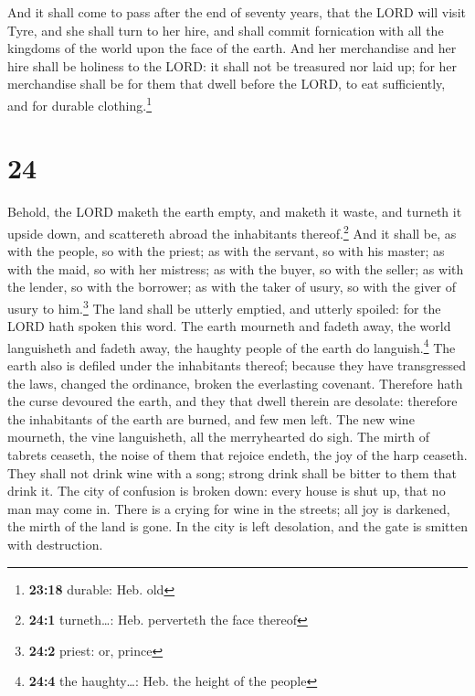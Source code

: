  And it shall come to pass after the end of seventy
years, that the LORD will visit Tyre, and she shall turn to her hire,
and shall commit fornication with all the kingdoms of the world upon the
face of the earth.  And her merchandise and her hire
shall be holiness to the LORD: it shall not be treasured nor laid up;
for her merchandise shall be for them that dwell before the LORD, to eat
sufficiently, and for durable clothing.\footnote{\textbf{23:18} durable:
  Heb. old}

\hypertarget{section-23}{%
\section{24}\label{section-23}}

 Behold, the LORD maketh the earth empty, and maketh it
waste, and turneth it upside down, and scattereth abroad the inhabitants
thereof.\footnote{\textbf{24:1} turneth\ldots: Heb. perverteth the face
  thereof}  And it shall be, as with the people, so with
the priest; as with the servant, so with his master; as with the maid,
so with her mistress; as with the buyer, so with the seller; as with the
lender, so with the borrower; as with the taker of usury, so with the
giver of usury to him.\footnote{\textbf{24:2} priest: or, prince}
 The land shall be utterly emptied, and utterly spoiled:
for the LORD hath spoken this word.  The earth mourneth
and fadeth away, the world languisheth and fadeth away, the haughty
people of the earth do languish.\footnote{\textbf{24:4} the
  haughty\ldots: Heb. the height of the people}  The earth
also is defiled under the inhabitants thereof; because they have
transgressed the laws, changed the ordinance, broken the everlasting
covenant.  Therefore hath the curse devoured the earth,
and they that dwell therein are desolate: therefore the inhabitants of
the earth are burned, and few men left.  The new wine
mourneth, the vine languisheth, all the merryhearted do sigh.
 The mirth of tabrets ceaseth, the noise of them that
rejoice endeth, the joy of the harp ceaseth.  They shall
not drink wine with a song; strong drink shall be bitter to them that
drink it.  The city of confusion is broken down: every
house is shut up, that no man may come in.  There is a
crying for wine in the streets; all joy is darkened, the mirth of the
land is gone.  In the city is left desolation, and the
gate is smitten with destruction.


